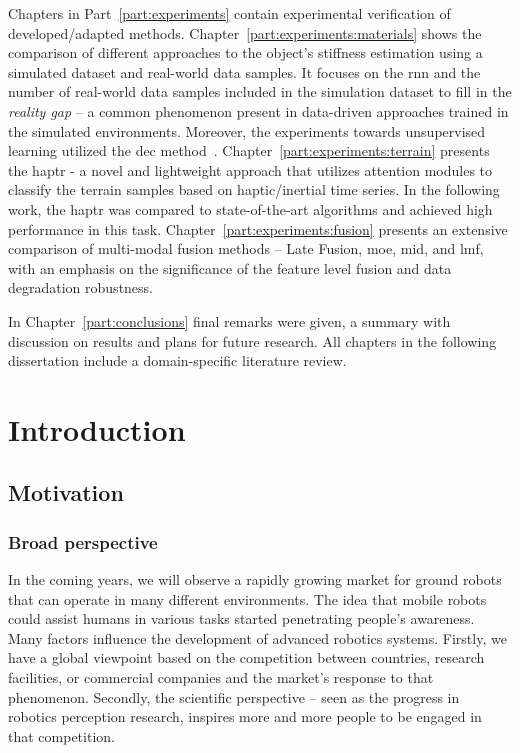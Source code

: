 \documentclass[a4paper, 10pt, twoside]{report}
\begin{document}
Chapters in Part~\ref{part:experiments} contain experimental verification of developed/adapted methods. Chapter~\ref{part:experiments:materials} shows the comparison of different approaches to the object's stiffness estimation using a simulated dataset and real-world data samples. It focuses on the \acrfull{rnn} and the number of real-world data samples included in the simulation dataset to fill in the \textit{reality gap} -- a common phenomenon present in data-driven approaches trained in the simulated environments. Moreover, the experiments towards unsupervised learning utilized the \acrfull{dec} method~\cite{DEC}. Chapter~\ref{part:experiments:terrain} presents the \acrfull{haptr} - a novel and lightweight approach that utilizes attention modules to classify the terrain samples based on haptic/inertial time series. In the following work, the \acrshort{haptr} was compared to state-of-the-art algorithms and achieved high performance in this task. Chapter~\ref{part:experiments:fusion} presents an extensive comparison of multi-modal fusion methods -- Late Fusion, \acrfull{moe}, \acrfull{mid}, and \acrfull{lmf}, with an emphasis on the significance of the feature level fusion and data degradation robustness. 

In Chapter~\ref{part:conclusions} final remarks were given, a summary with discussion on results and plans for future research. All chapters in the following dissertation include a domain-specific literature review.

\part{Introduction}
\label{part:introduction}

\chapter{Motivation}
\label{part:introduction:motivation}

\section{Broad perspective}
\label{part:introduction:motivation:perspective}

In the coming years, we will observe a rapidly growing market for ground robots that can operate in many different environments. The idea that mobile robots could assist humans in various tasks started penetrating people's awareness. Many factors influence the development of advanced robotics systems. Firstly, we have a global viewpoint based on the competition between countries, research facilities, or commercial companies and the market's response to that phenomenon. Secondly, the scientific perspective -- seen as the progress in robotics perception research, inspires more and more people to be engaged in that competition.
\end{document}
